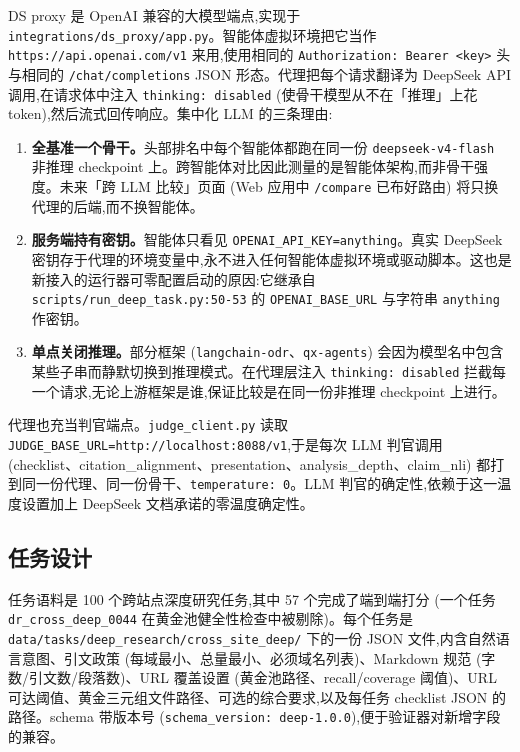 \documentclass[UTF8,a4paper,12pt,oneside]{ctexart}
\begin{document}
DS proxy 是 OpenAI 兼容的大模型端点,实现于 \texttt{integrations/ds\_proxy/app.py}。智能体虚拟环境把它当作 \texttt{https://api.openai.com/v1} 来用,使用相同的 \texttt{Authorization: Bearer <key>} 头与相同的 \texttt{/chat/completions} JSON 形态。代理把每个请求翻译为 DeepSeek API 调用,在请求体中注入 \texttt{thinking: disabled} (使骨干模型从不在「推理」上花 token),然后流式回传响应。集中化 LLM 的三条理由:

\begin{enumerate}[leftmargin=2em]
\item \textbf{全基准一个骨干。}头部排名中每个智能体都跑在同一份 \texttt{deepseek-v4-flash} 非推理 checkpoint 上。跨智能体对比因此测量的是智能体架构,而非骨干强度。未来「跨 LLM 比较」页面 (Web 应用中 \texttt{/compare} 已布好路由) 将只换代理的后端,而不换智能体。
\item \textbf{服务端持有密钥。}智能体只看见 \texttt{OPENAI\_API\_KEY=anything}。真实 DeepSeek 密钥存于代理的环境变量中,永不进入任何智能体虚拟环境或驱动脚本。这也是新接入的运行器可零配置启动的原因:它继承自 \texttt{scripts/run\_deep\_task.py:50-53} 的 \texttt{OPENAI\_BASE\_URL} 与字符串 \texttt{anything} 作密钥。
\item \textbf{单点关闭推理。}部分框架 (\texttt{langchain-odr}、\texttt{qx-agents}) 会因为模型名中包含某些子串而静默切换到推理模式。在代理层注入 \texttt{thinking: disabled} 拦截每一个请求,无论上游框架是谁,保证比较是在同一份非推理 checkpoint 上进行。
\end{enumerate}

代理也充当判官端点。\texttt{judge\_client.py} 读取 \texttt{JUDGE\_BASE\_URL=http://localhost:8088/v1},于是每次 LLM 判官调用 (checklist、citation\_alignment、presentation、analysis\_depth、claim\_nli) 都打到同一份代理、同一份骨干、\texttt{temperature: 0}。LLM 判官的确定性,依赖于这一温度设置加上 DeepSeek 文档承诺的零温度确定性。

\subsection{任务设计}

任务语料是 100 个跨站点深度研究任务,其中 57 个完成了端到端打分 (一个任务 \texttt{dr\_cross\_deep\_0044} 在黄金池健全性检查中被剔除)。每个任务是 \texttt{data/tasks/deep\_research/cross\_site\_deep/} 下的一份 JSON 文件,内含自然语言意图、引文政策 (每域最小、总量最小、必须域名列表)、Markdown 规范 (字数/引文数/段落数)、URL 覆盖设置 (黄金池路径、recall/coverage 阈值)、URL 可达阈值、黄金三元组文件路径、可选的综合要求,以及每任务 checklist JSON 的路径。schema 带版本号 (\texttt{schema\_version: deep-1.0.0}),便于验证器对新增字段的兼容。
\end{document}
